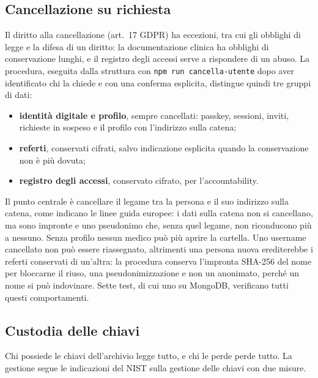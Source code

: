 \subsection{Cancellazione su richiesta}\label{sec:cancellazione}
Il diritto alla cancellazione (art.~17 GDPR\cite{gdpr}) ha eccezioni, tra cui gli obblighi di legge e la difesa di un diritto: la documentazione clinica ha obblighi di conservazione lunghi, e il registro degli accessi serve a rispondere di un abuso. La procedura, eseguita dalla struttura con \texttt{npm run cancella-utente} dopo aver identificato chi la chiede e con una conferma esplicita, distingue quindi tre gruppi di dati:
\begin{itemize}
  \item \textbf{identità digitale e profilo}, sempre cancellati: passkey, sessioni, inviti, richieste in sospeso e il profilo con l'indirizzo sulla catena;
  \item \textbf{referti}, conservati cifrati, salvo indicazione esplicita quando la conservazione non è più dovuta;
  \item \textbf{registro degli accessi}, conservato cifrato, per l'accountability.
\end{itemize}
Il punto centrale è cancellare il legame tra la persona e il suo indirizzo sulla catena, come indicano le linee guida europee\cite{edpb-blockchain}: i dati sulla catena non si cancellano, ma sono impronte e uno pseudonimo che, senza quel legame, non riconducono più a nessuno. Senza profilo nessun medico può più aprire la cartella. Uno username cancellato non può essere riassegnato, altrimenti una persona nuova erediterebbe i referti conservati di un'altra: la procedura conserva l'impronta SHA-256 del nome per bloccarne il riuso, una pseudonimizzazione e non un anonimato, perché un nome si può indovinare. Sette test, di cui uno su MongoDB, verificano tutti questi comportamenti.

\subsection{Custodia delle chiavi}\label{sec:chiavi}
Chi possiede le chiavi dell'archivio legge tutto, e chi le perde perde tutto. La gestione segue le indicazioni del NIST sulla gestione delle chiavi\cite{sp800-57} con due misure.


